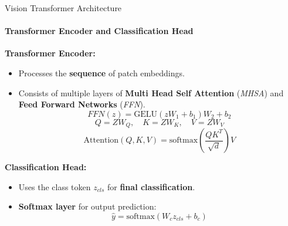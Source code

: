 \begin{frame}[fragile]{Vision Transformer Architecture}
  \framesubtitle{Transformer Encoder and Classification Head}
  \textbf{Transformer Encoder:}
  \begin{itemize}
    \item Processes the \textbf{sequence} of patch embeddings.
    \item Consists of multiple layers of \textbf{Multi Head Self Attention} (\textit{MHSA}) and \textbf{Feed Forward Networks} (\textit{FFN}).
      \begin{equation}
        FFN(z) = \text{GELU} (zW_1 + b_1) W_2 + b_2
      \end{equation}
      \begin{equation}
        Q = Z W_Q, \quad K = Z W_K, \quad V = Z W_V
      \end{equation}
      \begin{equation}
        \text{Attention}(Q, K, V) = \text{softmax} \left( \frac{QK^T}{\sqrt{d}} \right) V
      \end{equation}
  \end{itemize}

  \textbf{Classification Head:}
  \begin{itemize}
    \item Uses the class token $ z_{cls} $ for \textbf{final classification}.
    \item \textbf{Softmax layer} for output prediction:
      \begin{equation}
        \hat{y} = \text{softmax} (W_c z_{cls} + b_c)
      \end{equation}
  \end{itemize}
\end{frame}

